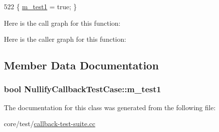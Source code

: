\begin{DoxyCode}
522 \{ \hyperlink{classNullifyCallbackTestCase_a62b9da8b806a1d864b7d27d9bc1a26ec}{m\_test1} = \textcolor{keyword}{true}; \}
\end{DoxyCode}


Here is the call graph for this function\+:




Here is the caller graph for this function\+:




\subsection{Member Data Documentation}
\subsubsection[{\texorpdfstring{m\+\_\+test1}{m_test1}}]{\setlength{\rightskip}{0pt plus 5cm}bool Nullify\+Callback\+Test\+Case\+::m\+\_\+test1\hspace{0.3cm}{\ttfamily [private]}}\hypertarget{classNullifyCallbackTestCase_a62b9da8b806a1d864b7d27d9bc1a26ec}{}\label{classNullifyCallbackTestCase_a62b9da8b806a1d864b7d27d9bc1a26ec}


The documentation for this class was generated from the following file\+:\begin{DoxyCompactItemize}
\item 
core/test/\hyperlink{callback-test-suite_8cc}{callback-\/test-\/suite.\+cc}\end{DoxyCompactItemize}
